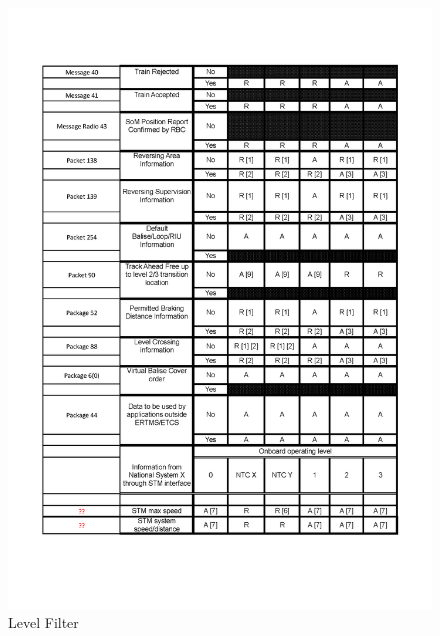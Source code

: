 \begin{figure}[hbtp]
\centering
\includegraphics [scale=0.6]{images/LevelFilter4}
\caption{Level Filter}
\end{figure}
\newpage

